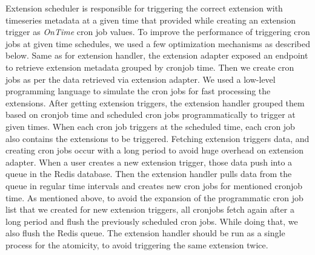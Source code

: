 Extension scheduler is responsible for triggering the correct extension with timeseries metadata at a given time that provided while creating an extension trigger as \emph{OnTime} cron job values. To improve the performance of triggering cron jobs at given time schedules, we used a few optimization mechanisms as described below. 
Same as for extension handler, the extension adapter exposed an endpoint to retrieve extension metadata grouped by cronjob time. Then we create cron jobs as per the data retrieved via extension adapter. We used a low-level programming language to simulate the cron jobs for fast processing the extensions. After getting extension triggers, the extension handler grouped them based on cronjob time and scheduled cron jobs programmatically to trigger at given times. 
When each cron job triggers at the scheduled time, each cron job also contains the extensions to be triggered. Fetching extension triggers data, and creating cron jobs occur with a long period to avoid huge overhead on extension adapter. When a user creates a new extension trigger, those data push into a queue in the Redis database. Then the extension handler pulls data from the queue in regular time intervals and creates new cron jobs for mentioned cronjob time. 
As mentioned above, to avoid the expansion of the programmatic cron job list that we created for new extension triggers, all cronjobs fetch again after a long period and flush the previously scheduled cron jobs. While doing that, we also flush the Redis queue.
The extension handler should be run as a single process for the atomicity, to avoid triggering the same extension twice.